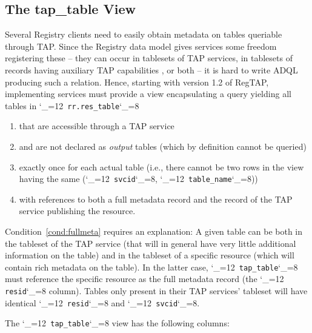 \documentclass[11pt,a4paper]{ivoa}
\makeatletter
\def\rtent#1{\texttt{\color{rtcolor}\verb|#1|}}
\def\makeunderscoreletter{\catcode`\_=12}
\def\makeunderscoresubscript{\catcode`\_=8}
\def\rtent{\makeunderscoreletter\relax\rt@nt}
\def\rt@nt#1{\texttt{\color{rtcolor} #1}\makeunderscoresubscript{}}
\makeatother
\begin{document}
\subsection{The tap\_table View}
\label{table_tap_table}

Several Registry clients need to easily obtain metadata on tables
queriable through TAP.  Since the Registry data model gives services
some freedom registering these -- they can occur in tablesets of TAP
services, in tablesets of records having auxiliary TAP capabilities
\citep{2019ivoa.spec.0520D}, or both -- it is hard to write ADQL
producing such a relation.  Hence, starting with version 1.2 of RegTAP,
implementing
services must provide a view encapsulating a query yielding all tables
in \rtent{rr.res_table}

\begin{enumerate}
\item that are accessible through a TAP service
\item and are not declared as \emph{output} tables (which by definition
cannot be queried)
\item exactly once for each actual table (i.e., there cannot be two rows
in the view having the same (\rtent{svcid}, \rtent{table_name}))
\item with references to both a full metadata record and the record of
the TAP service publishing the resource.\label{cond:fullmeta}
\end{enumerate}

Condition~\ref{cond:fullmeta} requires an explanation: A given table can
be both in the tableset of the TAP service (that will in general have
very little additional information on the table) and in the tableset of
a specific resource (which will contain rich metadata on the table).  In
the latter case, \rtent{tap_table} must reference the specific resource
as the full metadata record (the \rtent{resid} column).  Tables only
present in their TAP services' tableset will have identical
\rtent{resid} and \rtent{svcid}.

The \rtent{tap_table} view has the following columns:


\end{document}
